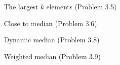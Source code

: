 \begin{frame}{The largest $k$ elements (Problem 3.5)}
\end{frame}
\begin{frame}{Close to median (Problem 3.6)}
\end{frame}
\begin{frame}{Dynamic median (Problem 3.8)}
\end{frame}
\begin{frame}{Weighted median (Problem 3.9)}
\end{frame}

